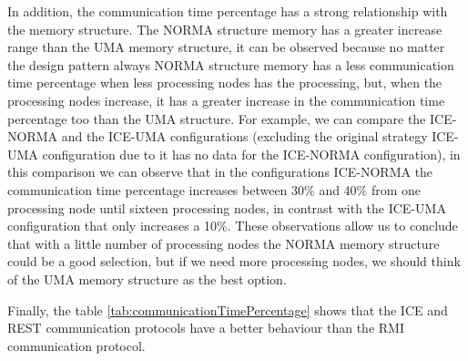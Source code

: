 In addition, the communication time percentage has a strong relationship with the memory structure. The NORMA structure memory has a greater increase range than the UMA memory structure, it can be observed because no matter the design pattern always NORMA structure memory has a less communication time percentage when less processing nodes has the processing, but, when the processing nodes increase, it has a greater increase in the communication time percentage too than the UMA structure. For example, we can compare the ICE-NORMA and the ICE-UMA configurations (excluding the original strategy ICE-UMA configuration due to it has no data for the ICE-NORMA configuration), in this comparison we can observe that in the configurations ICE-NORMA the communication time percentage increases between 30\% and 40\% from one processing node until sixteen processing nodes, in contrast with the ICE-UMA configuration that only increases a 10\%. These observations allow us to conclude that with a little number of processing nodes the NORMA memory structure could be a good selection, but if we need more processing nodes, we should think of the UMA memory structure as the best option.

Finally, the table \ref{tab:communicationTimePercentage} shows that the ICE and REST communication protocols have a better behaviour than the RMI communication protocol.



